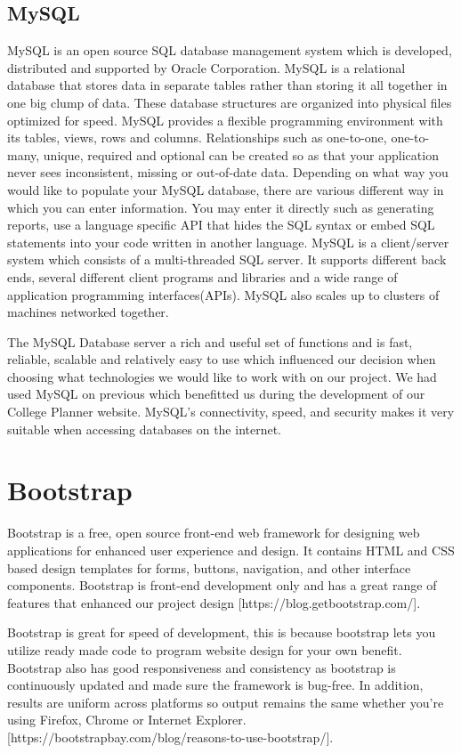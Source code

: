 \subsection{MySQL}
MySQL is an open source SQL database management system which is developed, distributed and supported by Oracle Corporation. MySQL is a relational database that stores data in separate tables rather than storing it all together in one big clump of data. These database structures are organized into physical files optimized for speed. MySQL provides a flexible programming environment with its tables, views, rows and columns. Relationships such as one-to-one, one-to-many, unique, required and optional can be created so as that your application never sees inconsistent, missing or out-of-date data. Depending on what way you would like to populate your MySQL database, there are various different way in which you can enter information. You may enter it directly such as generating reports, use a language specific API that hides the SQL syntax or embed SQL statements into your code written in another language. MySQL is a client/server system which consists of a multi-threaded SQL server. It supports different back ends, several different client programs and libraries and a wide range of application programming interfaces(APIs). MySQL also scales up to clusters of machines networked together.\par The MySQL Database server a rich and useful set of functions and is fast, reliable, scalable and relatively easy to use which influenced our decision when choosing what technologies we would like to work with on our project. We had used MySQL on previous which benefitted us during the development of our College Planner website. MySQL’s connectivity, speed, and security makes it very suitable when accessing databases on the internet.


\section{Bootstrap}
Bootstrap is a free, open source front-end web framework for designing web applications for enhanced user experience and design. It contains HTML and CSS based design templates for forms, buttons, navigation, and other interface components. Bootstrap is front-end development only and has a great range of features that enhanced our project design [https://blog.getbootstrap.com/]. \par Bootstrap is great for speed of development, this is because bootstrap lets you utilize ready made code to program website design for your own benefit. Bootstrap also has good responsiveness and consistency as bootstrap is continuously updated and made sure the framework is bug-free. In addition, results are uniform across platforms so output remains the same whether you’re using Firefox, Chrome or Internet Explorer. [https://bootstrapbay.com/blog/reasons-to-use-bootstrap/].

